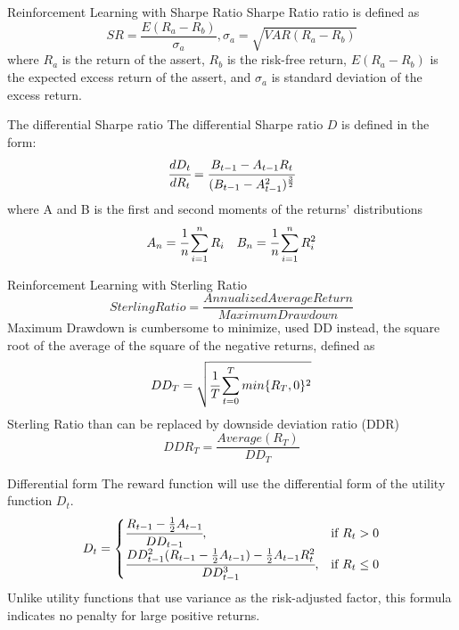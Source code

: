 \begin{frame}{Reinforcement Learning with Sharpe Ratio}
Sharpe Ratio ratio is defined as 
\[ SR = \frac{E(R_a - R_b)}{\sigma_a},
\sigma_a = \sqrt{VAR(R_a-R_b)}\]
where \(R_a\) is the return of the assert, 
\(R_b\) is the risk-free return,
\(E(R_a - R_b)\) is the expected excess return of the assert,
and \(\sigma_a\) is standard deviation of the excess return.
\end{frame}
\begin{frame}{The differential Sharpe ratio}
The differential Sharpe ratio \(D\) is defined in the form:
\[
\cfrac{d D_t}{d R_t} = 
\cfrac{B_{t-1}-A_{t-1} R_t}{(B_{t-1}-A_{t-1}^2)^\frac{3}{2}}
\]
where
A and B is the first and second moments of the returns' distributions
\[ A_n = \cfrac{1}{n}\sum_{i=1}^nR_i\quad
B_n = \cfrac{1}{n}\sum_{i=1}^nR_i^2
\]
\end{frame}
\begin{frame}{Reinforcement Learning with Sterling Ratio}
\[
Sterling Ratio=\frac{Annualized Average Return}{Maximum Drawdown}
\]
Maximum Drawdown is cumbersome to minimize, used DD instead, the square root of the average of the
square of the negative returns, defined as
\[
DD_T = \sqrt{\cfrac{1}{T}\sum_{t=0}^{T}{min\{R_T,0\}^2}}
\]
Sterling Ratio than can be replaced by downside deviation ratio (DDR)
\[
DDR_T = \frac{Average(R_T)}{DD_T}
\]
\end{frame}



\begin{frame}{Differential form}
The reward function will use the differential form of the utility function \(D_t\).
\[
D_t = 
\begin{cases}
    \cfrac{R_{t-1} -\frac{1}{2}A_{t-1}}{DD_{t-1}},&\text{if  }R_t > 0\\
    \cfrac{DD_{t-1}^2 (R_{t-1}-\frac{1}{2}A_{t-1})  -\frac{1}{2}A_{t-1} R_t^2}{DD_{t-1}^3},&\text{if  }R_t \leq 0
\end{cases}
\]
Unlike utility functions that use variance as the risk-adjusted factor, this formula indicates no penalty for large positive returns. 
\end{frame}